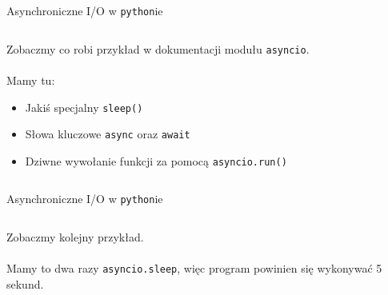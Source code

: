 \documentclass[aspectratio=169]{beamer}
\begin{document}
\begin{frame}{Asynchroniczne I/O w \texttt{python}ie}
  \begin{columns}
    \begin{column}{.48 \textwidth}
      Zobaczmy co robi przykład w dokumentacji modułu \texttt{asyncio}.\\~\\
      Mamy tu:
      \begin{itemize}
        \item Jakiś specjalny \texttt{sleep()}
        \item Słowa kluczowe \texttt{async} oraz
          \texttt{await}
        \item Dziwne wywołanie funkcji za pomocą
          \texttt{asyncio.run()}
      \end{itemize}
    \end{column}
    
    \begin{column}{.48 \textwidth}
      \scriptsize
      \inputminted[linenos]{python}{./examples/asyncHello.py}
    \end{column}
  \end{columns}
\end{frame}

\begin{frame}{Asynchroniczne I/O w \texttt{python}ie}
  \begin{columns}
    \begin{column}{.48 \textwidth}
      Zobaczmy kolejny przykład.\\~\\
      
      Mamy to dwa razy \texttt{asyncio.sleep}, więc program powinien
      się wykonywać 5 sekund.\\~\\

    \end{column}
    
    \begin{column}{.48 \textwidth}
      \scriptsize
      \inputminted[linenos]{python}{./examples/asyncTasks.py}
    \end{column}
  \end{columns}
\end{frame}
\end{document}
